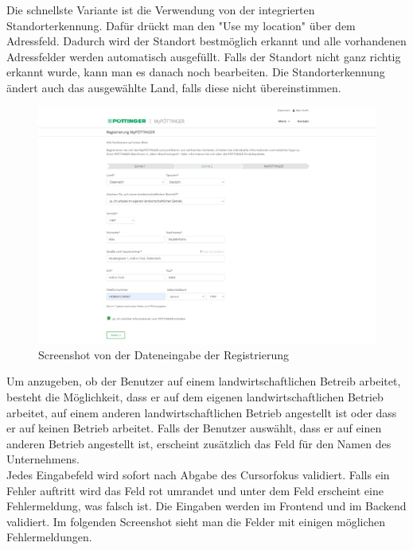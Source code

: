 Die schnellste Variante ist die Verwendung von der integrierten Standorterkennung. Dafür drückt man den "Use my location" über dem Adressfeld. Dadurch wird der Standort bestmöglich erkannt und alle vorhandenen Adressfelder werden automatisch ausgefüllt. Falls der Standort nicht ganz richtig erkannt wurde, kann man es danach noch bearbeiten. Die Standorterkennung ändert auch das ausgewählte Land, falls diese nicht übereinstimmen.

\begin{figure}[H]
	\centerline{
		\includegraphics[width=1\textwidth]{./grafiken/erm_register_data.png}
	}
	\vskip0pt
	\caption{Screenshot von der Dateneingabe der Registrierung} \label{fig:register2}
\end{figure}

Um anzugeben, ob der Benutzer auf einem landwirtschaftlichen Betreib arbeitet, besteht die Möglichkeit, dass er auf dem eigenen landwirtschaftlichen Betrieb arbeitet, auf einem anderen landwirtschaftlichen Betrieb angestellt ist oder dass er auf keinen Betrieb arbeitet. Falls der Benutzer auswählt, dass er auf einen anderen Betrieb angestellt ist, erscheint zusätzlich das Feld für den Namen des Unternehmens.\\

Jedes Eingabefeld wird sofort nach Abgabe des Cursorfokus validiert. Falls ein Fehler auftritt wird das Feld rot umrandet und unter dem Feld erscheint eine Fehlermeldung, was falsch ist. Die Eingaben werden im Frontend und im Backend validiert. Im folgenden Screenshot sieht man die Felder mit einigen möglichen Fehlermeldungen.

